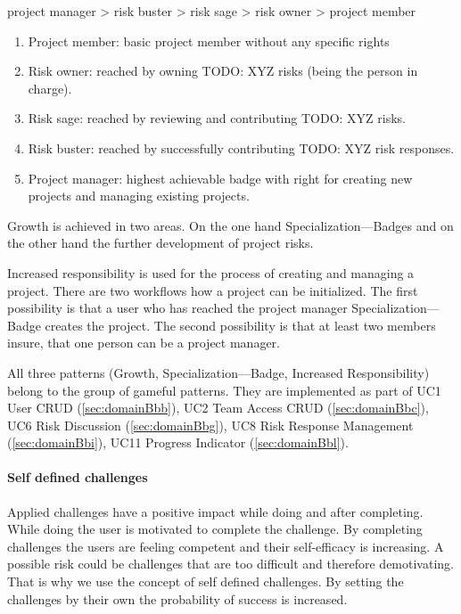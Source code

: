 project manager > risk buster > risk sage > risk owner > project member

\begin{enumerate}
	\item Project member: basic project member without any specific rights
	\item Risk owner: reached by owning TODO: XYZ risks (being the person in charge).
	\item Risk sage: reached by reviewing and contributing TODO: XYZ risks.
	\item Risk buster: reached by successfully contributing TODO: XYZ risk responses.
	\item Project manager: highest achievable badge with right for creating new projects and managing existing projects.
\end{enumerate}

Growth is achieved in two areas. On the one hand Specialization—Badges and on the other hand the further development of project risks.

Increased responsibility is used for the process of creating and managing a project. There are two workflows how a project can be initialized. The first possibility is that a user who has reached the project manager Specialization—Badge creates the project. The second possibility is that at least two members insure, that one person can be a project manager.

All three patterns (Growth, Specialization—Badge, Increased Responsibility) belong to the group of gameful patterns.
They are implemented as part of \ac{UC}1 User CRUD (\ref{sec:domainBbb}), \ac{UC}2 Team Access CRUD (\ref{sec:domainBbc}), \ac{UC}6 Risk Discussion (\ref{sec:domainBbg}), \ac{UC}8 Risk Response Management (\ref{sec:domainBbi}), \ac{UC}11 Progress Indicator (\ref{sec:domainBbl}).

\paragraph*{Self defined challenges}

Applied challenges have a positive impact while doing and after completing. While doing the user is motivated to complete the challenge. By completing challenges the users are feeling competent and their self-efficacy is increasing. A possible risk could be challenges that are too difficult and therefore demotivating. That is why we use the concept of self defined challenges. By setting the challenges by their own the probability of success is increased.

